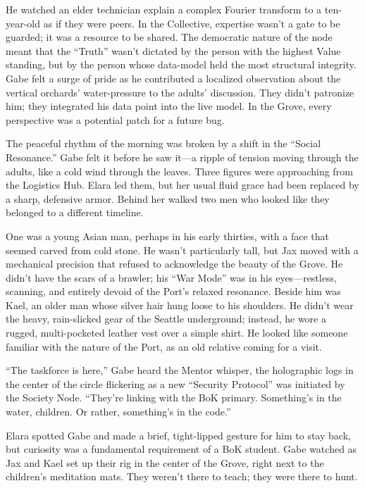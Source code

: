 He watched an elder technician explain a complex Fourier transform to a ten-year-old as if they were peers. In the Collective, expertise wasn't a gate to be guarded; it was a resource to be shared. The democratic nature of the node meant that the ``Truth'' wasn't dictated by the person with the highest Value standing, but by the person whose data-model held the most structural integrity. Gabe felt a surge of pride as he contributed a localized observation about the vertical orchards' water-pressure to the adults' discussion. They didn't patronize him; they integrated his data point into the live model. In the Grove, every perspective was a potential patch for a future bug.


The peaceful rhythm of the morning was broken by a shift in the ``Social Resonance.'' Gabe felt it before he saw it—a ripple of tension moving through the adults, like a cold wind through the leaves. Three figures were approaching from the Logistics Hub. Elara led them, but her usual fluid grace had been replaced by a sharp, defensive armor. Behind her walked two men who looked like they belonged to a different timeline.

One was a young Asian man, perhaps in his early thirties, with a face that seemed carved from cold stone. He wasn't particularly tall, but Jax moved with a mechanical precision that refused to acknowledge the beauty of the Grove. He didn't have the scars of a brawler; his ``War Mode'' was in his eyes—restless, scanning, and entirely devoid of the Port's relaxed resonance. Beside him was Kael, an older man whose silver hair hung loose to his shoulders. He didn't wear the heavy, rain-slicked gear of the Seattle underground; instead, he wore a rugged, multi-pocketed leather vest over a simple shirt. He looked like someone familiar with the nature of the Port, as an old relative coming for a visit.

``The taskforce is here,'' Gabe heard the Mentor whisper, the holographic logs in the center of the circle flickering as a new ``Security Protocol'' was initiated by the Society Node. ``They're linking with the BoK primary. Something's in the water, children. Or rather, something's in the code.''


Elara spotted Gabe and made a brief, tight-lipped gesture for him to stay back, but curiosity was a fundamental requirement of a BoK student. Gabe watched as Jax and Kael set up their rig in the center of the Grove, right next to the children's meditation mats. They weren't there to teach; they were there to hunt. 

